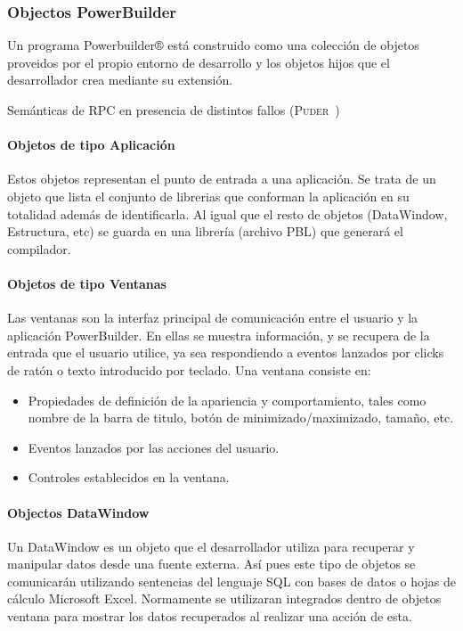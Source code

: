 {\subsubsection{Objectos PowerBuilder}

Un programa Powerbuilder® está construido como una colección de objetos proveidos 
por el propio entorno de desarrollo y los objetos hijos que el desarrollador crea mediante su extensión.

\begin{table}[hp]
  \centering
  \resizebox{\textwidth}{!}
  {
  }
  \caption[Semánticas de \acs{RPC} en presencia de distintos fallos]
  {Semánticas de \acs{RPC} en presencia de distintos fallos
    (\textsc{Puder}~\cite{puder05:_distr_system_archit})}
  \label{tab:rpc-semantics}
\end{table}

\paragraph{Objetos de tipo Aplicación}
Estos objetos representan el punto de entrada a una aplicación. Se trata de un objeto que
lista el conjunto de librerias que conforman la aplicación en su totalidad además de identificarla. Al igual que
el resto de objetos (DataWindow, Estructura, etc) se guarda en una librería (archivo PBL) que generará el compilador.

\paragraph{Objetos de tipo Ventanas}
Las ventanas son la interfaz principal de comunicación entre el usuario y la aplicación PowerBuilder.
En ellas se muestra información, y se recupera de la entrada que el usuario utilice, ya sea respondiendo
a eventos lanzados por clicks de ratón o texto introducido por teclado.
Una ventana consiste en:
\begin{itemize}
\item Propiedades de definición de la apariencia y comportamiento, tales como nombre de la barra de titulo, botón de minimizado/maximizado, tamaño, etc.
\item Eventos lanzados por las acciones del usuario.
\item Controles establecidos en la ventana.
\end{itemize}

\paragraph{Objectos DataWindow}
Un DataWindow es un objeto que el desarrollador utiliza para recuperar y manipular datos desde una fuente externa. Así pues este tipo de objetos se comunicarán utilizando 
sentencias del lenguaje SQL con bases de datos o hojas de cálculo Microsoft Excel. Normamente se utilizaran integrados dentro de objetos ventana para mostrar los datos
recuperados al realizar una acción de esta.
}

